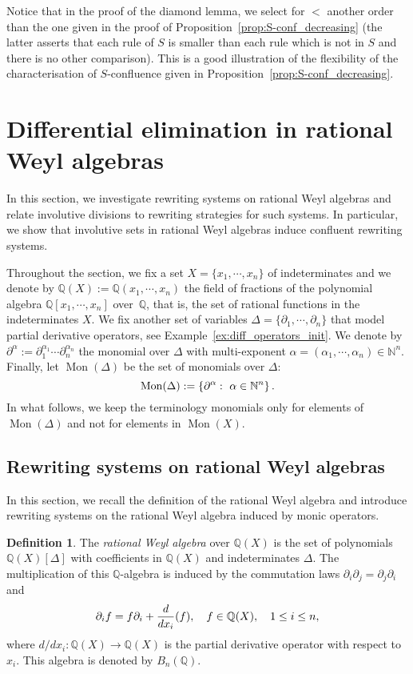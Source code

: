 \documentclass[10pt]{easychair}
\theoremstyle{definition}
\newtheorem{definition}[theorem]{Definition}
\newcommand\diff[1]{\partial_{#1}}
\newcommand\Q{\mathbb{Q}}
\newcommand\N{\mathbb{N}}
\newcommand\QX{\mathbb{Q}[x_1,\cdots,x_n]}
\newcommand\QXX{\mathbb{Q}(x_1,\cdots,x_n)}
\newcommand\Weyl[1]{B_{#1}(\Q)}
\newcommand\monBasis{\Mon(\Delta)}
\DeclareMathOperator{\Mon}{Mon}
\begin{document}
Notice that in the proof of the diamond lemma, we select for $<$ another order
than the one given in the proof of Proposition~\ref{prop:S-conf_decreasing} (the
latter asserts that each rule of $S$ is smaller than each rule which is not in
$S$ and there is no other comparison). This is a good illustration of the
flexibility of the characterisation of $S$-confluence given in
Proposition~\ref{prop:S-conf_decreasing}. 

\section{Differential elimination in rational Weyl algebras}
\label{sec:differential_elimination_in_rational_Weyl_algebras}

In this section, we investigate rewriting systems on rational Weyl
algebras and relate involutive divisions to rewriting strategies for such
systems. In particular, we show that involutive sets in rational Weyl
algebras induce confluent rewriting systems.
\medskip

Throughout the section, we fix a set $X=\{x_1,\cdots,x_n\}$ of
indeterminates and we denote by $\Q(X):=\QXX$ the field of fractions of
the polynomial algebra $\QX$ over~$\Q$, that is, the set of rational
functions in the indeterminates $X$. We fix another set of variables
$\Delta=\{\diff{1},\cdots,\diff{n}\}$ that model partial derivative
operators, see Example~\ref{ex:diff_operators_init}. We denote by
$\partial^{\alpha}:=\diff{1}^{\alpha_1}\cdots\diff{n}^{\alpha_n}$ the
monomial over $\Delta$ with multi-exponent
$\alpha=(\alpha_1,\cdots,\alpha_n)\in\N^n$. Finally, let $\monBasis$ be
the set of monomials over $\Delta$:
\[\monBasis:=\left\{\partial^\alpha:\ \alpha\in\N^n\right\}.
\smallskip\]
In what follows, we keep the terminology monomials only for elements of
$\Mon(\Delta)$ and not for elements in $\Mon(X)$.

\subsection{Rewriting systems on rational Weyl algebras}
\label{sec:rewriting_systems_on_Weyl_algebras}

In this section, we recall the definition of the rational Weyl algebra
and introduce rewriting systems on the rational Weyl algebra induced by
monic operators.
\medskip

\begin{definition}
  The {\it rational Weyl algebra} over $\Q(X)$ is the set of polynomials
  $\Q(X)[\Delta]$ with coefficients in $\Q(X)$ and indeterminates
  $\Delta$. The multiplication of this $\mathbb Q$-algebra is induced by
  the commutation laws $\partial_i\partial_j=\partial_j\partial_i$ and
  \[\diff{i}f=f\diff{i}+\frac{d}{dx_i}(f),\quad f\in\Q(X),\quad
  1\leq i\leq n,
  \smallskip\]
  where $d/dx_i:\Q(X)\to\Q(X)$ is the partial derivative operator with
  respect to~$x_i$. This algebra is denoted by $\Weyl{n}$.
\end{definition}
\smallskip
\end{document}
